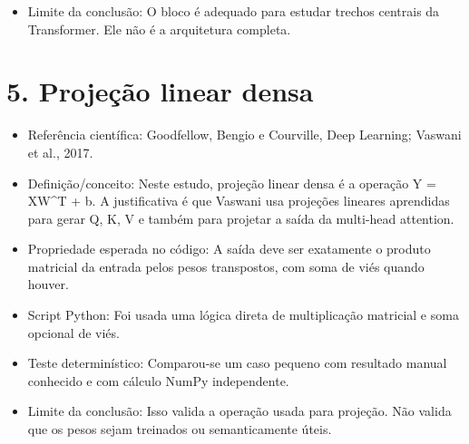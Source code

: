 \begin{itemize}
\item Limite da conclusão:
O bloco é adequado para estudar trechos centrais da Transformer. Ele não é a
arquitetura completa.
\end{itemize}



\section{5. Projeção linear densa}


\begin{itemize}
\item Referência científica:
Goodfellow, Bengio e Courville, Deep Learning; Vaswani et al., 2017.
\end{itemize}

\begin{itemize}
\item Definição/conceito:
Neste estudo, projeção linear densa é a operação Y = XW\textasciicircum{}T + b. A justificativa
é que Vaswani usa projeções lineares aprendidas para gerar Q, K, V e também
para projetar a saída da multi-head attention.
\end{itemize}

\begin{itemize}
\item Propriedade esperada no código:
A saída deve ser exatamente o produto matricial da entrada pelos pesos
transpostos, com soma de viés quando houver.
\end{itemize}

\begin{itemize}
\item Script Python:
Foi usada uma lógica direta de multiplicação matricial e soma opcional de viés.
\end{itemize}

\begin{itemize}
\item Teste determinístico:
Comparou-se um caso pequeno com resultado manual conhecido e com cálculo NumPy
independente.
\end{itemize}

\begin{itemize}
\item Limite da conclusão:
Isso valida a operação usada para projeção. Não valida que os pesos sejam
treinados ou semanticamente úteis.
\end{itemize}



